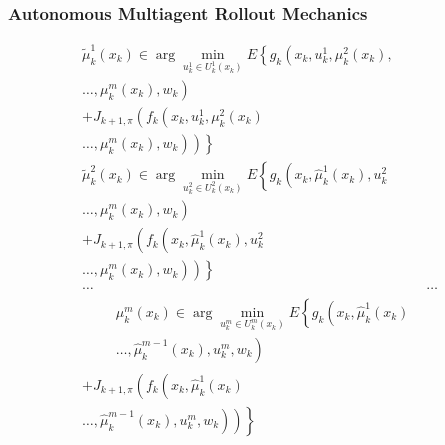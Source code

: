\documentclass{beamer}
\begin{document}
\begin{frame}
\frametitle{Autonomous Multiagent Rollout Mechanics}

$$
\begin{array}{c}
\tilde{\mu}_{k}^{1}\left(x_{k}\right) \in \arg \min _{u_{k}^{1} \in U_{k}^{1}\left(x_{k}\right)} E\left\{g_{k}\left(x_{k}, u_{k}^{1}, \mu_{k}^{2}\left(x_{k}\right),\right.\right. \\
\left.\ldots, \mu_{k}^{m}\left(x_{k}\right), w_{k}\right) \\
+J_{k+1, \pi}\left(f_{k}\left(x_{k}, u_{k}^{1}, \mu_{k}^{2}\left(x_{k}\right)\right.\right. \\
\left.\left.\left.\ldots, \mu_{k}^{m}\left(x_{k}\right), w_{k}\right)\right)\right\} \\
\tilde{\mu}_{k}^{2}\left(x_{k}\right) \in \arg \min _{u_{k}^{2} \in U_{k}^{2}\left(x_{k}\right)} E\left\{g_{k}\left(x_{k}, \widehat{\mu}_{k}^{1}\left(x_{k}\right), u_{k}^{2}\right.\right. \\
\left.\ldots, \mu_{k}^{m}\left(x_{k}\right), w_{k}\right) \\
+J_{k+1, \pi}\left(f_{k}\left(x_{k}, \widehat{\mu}_{k}^{1}\left(x_{k}\right), u_{k}^{2}\right.\right. \\
\left.\left.\left.\ldots, \mu_{k}^{m}\left(x_{k}\right), w_{k}\right)\right)\right\} \\
\ldots & \ldots \\
\qquad \begin{array}{c}
\mu_{k}^{m}\left(x_{k}\right) \in \arg \min _{u_{k}^{m} \in U_{k}^{m}\left(x_{k}\right)} E\left\{g_{k}\left(x_{k}, \widehat{\mu}_{k}^{1}\left(x_{k}\right)\right.\right. \\
\left.\ldots, \widehat{\mu}_{k}^{m-1}\left(x_{k}\right), u_{k}^{m}, w_{k}\right)
\end{array} \\
+J_{k+1, \pi}\left(f_{k}\left(x_{k}, \widehat{\mu}_{k}^{1}\left(x_{k}\right)\right.\right. \\
\left.\left.\left.\ldots, \widehat{\mu}_{k}^{m-1}\left(x_{k}\right), u_{k}^{m}, w_{k}\right)\right)\right\}
\end{array}
$$

\end{frame}

\end{document}
